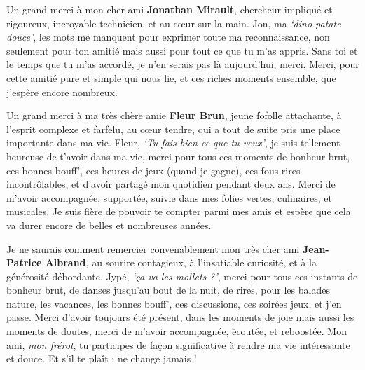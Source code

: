 \documentclass[
  a4paper,12pt,twoside,onecolumn,openright,final,oldfontcommands]{memoir}
\begin{document}
Un grand merci à mon cher ami \textbf{Jonathan Mirault}, chercheur impliqué et rigoureux, incroyable technicien, et au cœur sur la main. Jon, ma \emph{`dino-patate douce'}, les mots me manquent pour exprimer toute ma reconnaissance, non seulement pour ton amitié mais aussi pour tout ce que tu m'as appris. Sans toi et le temps que tu m'as accordé, je n'en serais pas là aujourd'hui, merci. Merci, pour cette amitié pure et simple qui nous lie, et ces riches moments ensemble, que j'espère encore nombreux.

Un grand merci à ma très chère amie \textbf{Fleur Brun}, jeune fofolle attachante, à l'esprit complexe et farfelu, au cœur tendre, qui a tout de suite pris une place importante dans ma vie. Fleur, \emph{`Tu fais bien ce que tu veux'}, je suis tellement heureuse de t'avoir dans ma vie, merci pour tous ces moments de bonheur brut, ces bonnes bouff', ces heures de jeux (quand je gagne), ces fous rires incontrôlables, et d'avoir partagé mon quotidien pendant deux ans. Merci de m'avoir accompagnée, supportée, suivie dans mes folies vertes, culinaires, et musicales. Je suis fière de pouvoir te compter parmi mes amis et espère que cela va durer encore de belles et nombreuses années.

Je ne saurais comment remercier convenablement mon très cher ami \textbf{Jean-Patrice Albrand}, au sourire contagieux, à l'insatiable curiosité, et à la générosité débordante. Jypé, \emph{`ça va les mollets ?'}, merci pour tous ces instants de bonheur brut, de danses jusqu'au bout de la nuit, de rires, pour les balades nature, les vacances, les bonnes bouff', ces discussions, ces soirées jeux, et j'en passe. Merci d'avoir toujours été présent, dans les moments de joie mais aussi les moments de doutes, merci de m'avoir accompagnée, écoutée, et reboostée. Mon ami, \emph{mon frérot}, tu participes de façon significative à rendre ma vie intéressante et douce. Et s'il te plaît : ne change jamais !
\end{document}

